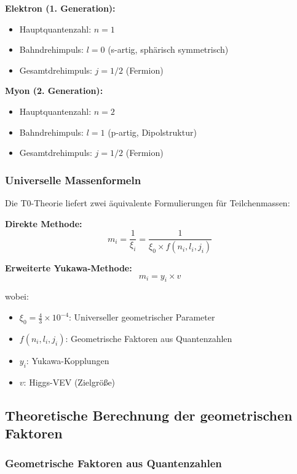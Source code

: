 \documentclass[12pt,a4paper]{article}
\theoremstyle{definition}
\begin{document}
\textbf{Elektron (1. Generation):}
\begin{itemize}
	\item Hauptquantenzahl: $n = 1$
	\item Bahndrehimpuls: $l = 0$ (s-artig, sph{\"a}risch symmetrisch)
	\item Gesamtdrehimpuls: $j = 1/2$ (Fermion)
\end{itemize}

\textbf{Myon (2. Generation):}
\begin{itemize}
	\item Hauptquantenzahl: $n = 2$
	\item Bahndrehimpuls: $l = 1$ (p-artig, Dipolstruktur)
	\item Gesamtdrehimpuls: $j = 1/2$ (Fermion)
\end{itemize}

\subsubsection{Universelle Massenformeln}

Die T0-Theorie liefert zwei {\"a}quivalente Formulierungen f{\"u}r Teilchenmassen:

\textbf{Direkte Methode:}
\begin{equation}
	m_i = \frac{1}{\xi_i} = \frac{1}{\xi_0 \times f(n_i, l_i, j_i)}
	\label{eq:direct_mass_formula}
\end{equation}

\textbf{Erweiterte Yukawa-Methode:}
\begin{equation}
	m_i = y_i \times v
	\label{eq:yukawa_mass_formula}
\end{equation}

wobei:
\begin{itemize}
	\item $\xi_0 = \frac{4}{3} \times 10^{-4}$: Universeller geometrischer Parameter
	\item $f(n_i, l_i, j_i)$: Geometrische Faktoren aus Quantenzahlen
	\item $y_i$: Yukawa-Kopplungen
	\item $v$: Higgs-VEV (Zielgr{\"o}{\ss}e)
\end{itemize}

\subsection{Theoretische Berechnung der geometrischen Faktoren}

\subsubsection{Geometrische Faktoren aus Quantenzahlen}
\end{document}
